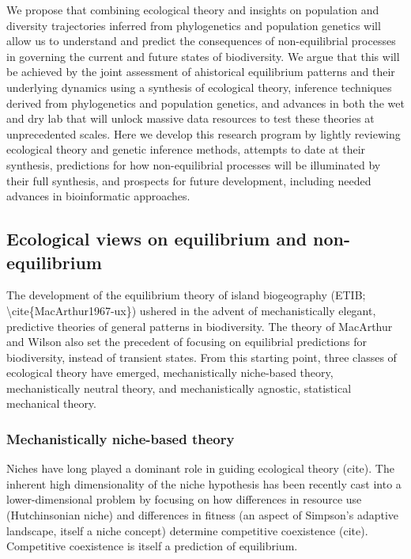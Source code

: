 \documentclass[]{article}
\begin{document}
We propose that combining ecological theory and insights on population
and diversity trajectories inferred from phylogenetics and population
genetics will allow us to understand and predict the consequences of
non-equilibrial processes in governing the current and future states of
biodiversity. We argue that this will be achieved by the joint
assessment of ahistorical equilibrium patterns and their underlying
dynamics using a synthesis of ecological theory, inference techniques
derived from phylogenetics and population genetics, and advances in both
the wet and dry lab that will unlock massive data resources to test
these theories at unprecedented scales. Here we develop this research
program by lightly reviewing ecological theory and genetic inference
methods, attempts to date at their synthesis, predictions for how
non-equilibrial processes will be illuminated by their full synthesis,
and prospects for future development, including needed advances in
bioinformatic approaches.

\subsection{Ecological views on equilibrium and
non-equilibrium}\label{ecological-views-on-equilibrium-and-non-equilibrium}

The development of the equilibrium theory of island biogeography (ETIB;
\textbackslash{}cite\{MacArthur1967-ux\}) ushered in the advent of
mechanistically elegant, predictive theories of general patterns in
biodiversity. The theory of MacArthur and Wilson also set the precedent
of focusing on equilibrial predictions for biodiversity, instead of
transient states. From this starting point, three classes of ecological
theory have emerged, mechanistically niche-based theory, mechanistically
neutral theory, and mechanistically agnostic, statistical mechanical
theory.

\subsubsection{Mechanistically niche-based
theory}\label{mechanistically-niche-based-theory}

Niches have long played a dominant role in guiding ecological theory
(cite). The inherent high dimensionality of the niche hypothesis has
been recently cast into a lower-dimensional problem by focusing on how
differences in resource use (Hutchinsonian niche) and differences in
fitness (an aspect of Simpson's adaptive landscape, itself a niche
concept) determine competitive coexistence (cite). Competitive
coexistence is itself a prediction of equilibrium.
\end{document}
